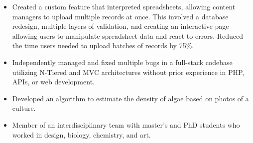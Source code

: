 \documentclass[10pt,a4paper,ragged2e]{altacv}
\begin{document}
\divider

\begin{itemize}
\item Created a custom feature that interpreted spreadsheets, allowing content managers to upload multiple records at once. This involved a database redesign, multiple layers of validation, and creating an interactive page allowing users to manipulate spreadsheet data and react to errors. Reduced the time users needed to upload batches of records by 75\%.
\item Independently managed and fixed multiple bugs in a full-stack codebase utilizing N-Tiered and MVC architectures without prior experience in PHP, APIs, or web development.
\end{itemize}

\divider

\begin{itemize}
\item Developed an algorithm to estimate the density of algae based on photos of a culture.
\item Member of an interdisciplinary team with master's and PhD students who worked in design, biology, chemistry, and art.
\end{itemize}
\end{document}
